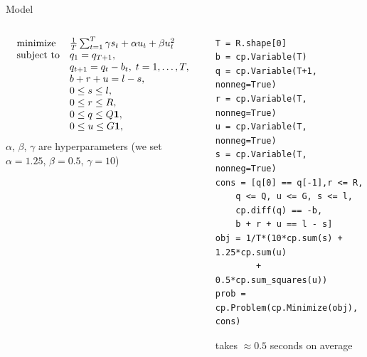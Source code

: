 \documentclass[aspectratio=169,11pt]{beamer}
\begin{document}
\begin{frame}[fragile]{Model}
    \begin{columns}
        \begin{column}{0.46\textwidth}
    \[
        \begin{array}{ll}
            \mbox{minimize}   &  \frac{1}{T}\sum_{t=1}^{T} \gamma s_t + \alpha u_t + \beta u_t^2 \\
            \mbox{subject to} & q_1 = q_{T+1}, \\
            & q_{t+1} = q_t - b_t, \; t = 1, \ldots, T, \\
            & b + r + u = l-s, \\
            & 0 \leq s \leq l, \\
            & 0 \leq r \leq R, \\
            & 0 \leq q \leq Q \mathbf 1, \\
            & 0 \leq u \leq G \mathbf 1, \\
        \end{array}
    \]
    $\alpha$, $\beta$, $\gamma$ are hyperparameters
    (we set $\alpha = 1.25$, $\beta = 0.5$, $\gamma = 10$)
    \vfill
    \end{column}
    \begin{column}{0.54\textwidth}
\begin{lstlisting}[language=mypython, basicstyle=\footnotesize\ttfamily, belowskip=0em]
T = R.shape[0]
b = cp.Variable(T)
q = cp.Variable(T+1, nonneg=True)
r = cp.Variable(T, nonneg=True)
u = cp.Variable(T, nonneg=True)
s = cp.Variable(T, nonneg=True)
cons = [q[0] == q[-1],r <= R,
    q <= Q, u <= G, s <= l,
    cp.diff(q) == -b,
    b + r + u == l - s]
obj = 1/T*(10*cp.sum(s) + 1.25*cp.sum(u) 
        + 0.5*cp.sum_squares(u))
prob = cp.Problem(cp.Minimize(obj), cons)
\end{lstlisting}
    \vfill
    takes $\approx0.5$ seconds on average
    \end{column}
    \end{columns}
\end{frame}
\end{document}
